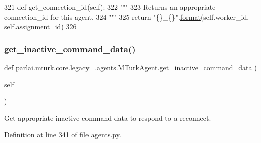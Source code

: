 \begin{DoxyCode}
321     \textcolor{keyword}{def }get\_connection\_id(self):
322         \textcolor{stringliteral}{"""}
323 \textcolor{stringliteral}{        Returns an appropriate connection\_id for this agent.}
324 \textcolor{stringliteral}{        """}
325         \textcolor{keywordflow}{return} \textcolor{stringliteral}{"\{\}\_\{\}"}.\hyperlink{namespaceparlai_1_1chat__service_1_1services_1_1messenger_1_1shared__utils_a32e2e2022b824fbaf80c747160b52a76}{format}(self.worker\_id, self.assignment\_id)
326 
\end{DoxyCode}
\mbox{\label{classparlai_1_1mturk_1_1core_1_1legacy__2018_1_1agents_1_1MTurkAgent_aa67e2dfc302ace9edd9d12a79ff24521}} 
\subsubsection{\texorpdfstring{get\+\_\+inactive\+\_\+command\+\_\+data()}{get\_inactive\_command\_data()}}
{\footnotesize\ttfamily def parlai.\+mturk.\+core.\+legacy\+\_.\+agents.\+M\+Turk\+Agent.\+get\+\_\+inactive\+\_\+command\+\_\+data (\begin{DoxyParamCaption}\item[{}]{self }\end{DoxyParamCaption})}

\begin{DoxyVerb}Get appropriate inactive command data to respond to a reconnect.
\end{DoxyVerb}
 

Definition at line 341 of file agents.\+py.


